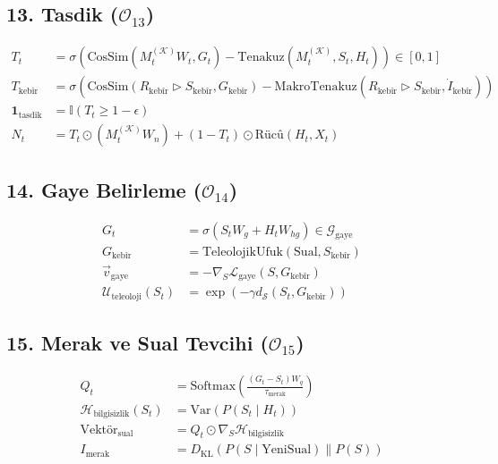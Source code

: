 \documentclass[11pt, a4paper]{article}
\begin{document}
\subsection{13. Tasdik ($\mathcal{O}_{13}$)}
\begin{align}
T_t &= \sigma\left( \text{CosSim}(M_t^{(\mathcal{K})} W_t, G_t) - \text{Tenakuz}(M_t^{(\mathcal{K})}, S_t, H_t) \right) \in [0, 1] \\
T_{\text{kebîr}} &= \sigma\left( \text{CosSim}(R_{\text{kebîr}} \triangleright S_{\text{kebîr}}, G_{\text{kebîr}}) - \text{MakroTenakuz}(R_{\text{kebîr}} \triangleright S_{\text{kebîr}}, \dot{I}_{\text{kebîr}}) \right) \\
\mathbf{1}_{\text{tasdik}} &= \mathbb{I}(T_t \ge 1 - \epsilon) \\
N_t &= T_t \odot (M_t^{(\mathcal{K})} W_n) + (1 - T_t) \odot \text{Rücû}(H_t, X_t)
\end{align}

\subsection{14. Gaye Belirleme ($\mathcal{O}_{14}$)}
\begin{align}
G_t &= \sigma(S_t W_g + H_t W_{hg}) \in \mathcal{G}_{\text{gaye}} \\
G_{\text{kebîr}} &= \text{TeleolojikUfuk}(\text{Sual}, S_{\text{kebîr}}) \\
\vec{v}_{\text{gaye}} &= -\nabla_{S} \mathcal{L}_{\text{gaye}}(S, G_{\text{kebîr}}) \\
\mathcal{U}_{\text{teleoloji}}(S_t) &= \exp\left( -\gamma d_{\mathcal{S}}(S_t, G_{\text{kebîr}}) \right)
\end{align}

\subsection{15. Merak ve Sual Tevcihi ($\mathcal{O}_{15}$)}
\begin{align}
Q_t &= \text{Softmax}\left( \frac{(G_t - S_t) W_q}{\tau_{\text{merak}}} \right) \\
\mathcal{H}_{\text{bilgisizlik}}(S_t) &= \text{Var}(P(S_t \mid H_t)) \\
\text{Vektör}_{\text{sual}} &= Q_t \odot \nabla_{S} \mathcal{H}_{\text{bilgisizlik}} \\
I_{\text{merak}} &= D_{\text{KL}}\left( P(S \mid \text{YeniSual}) \parallel P(S) \right)
\end{align}
\end{document}
